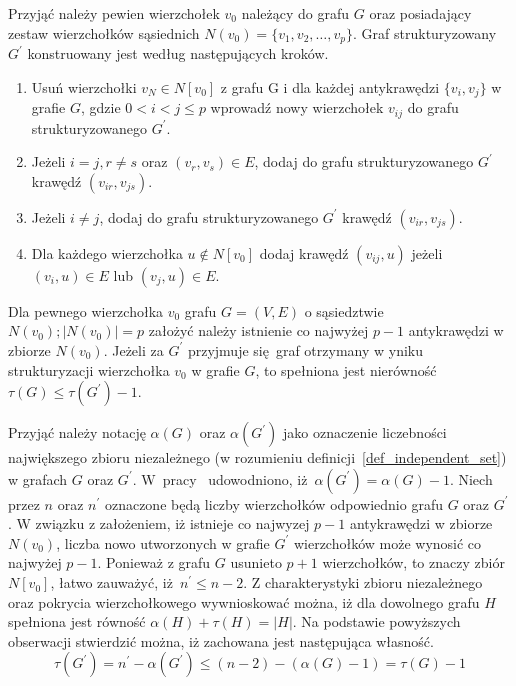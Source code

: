 {  Przyjąć należy pewien wierzchołek $v_0$ należący do grafu $G$ oraz posiadający zestaw wierzchołków sąsiednich $N(v_0)=\{v_1, v_2, \ldots, v_p\}$.
  Graf strukturyzowany $G^\prime$ konstruowany jest według następujących kroków.
  \begin{enumerate}
    \item Usuń wierzchołki $v_N \in N[v_0]$ z grafu G i dla każdej antykrawędzi $\{v_i, v_j\}$ w grafie $G$, gdzie $0 < i < j \leq p$ wprowadź nowy wierzchołek $v_{ij}$ do grafu strukturyzowanego $G^\prime$.
    \item Jeżeli $i=j, r\neq s$ oraz $(v_r, v_s) \in E$, dodaj do grafu strukturyzowanego $G^\prime$ krawędź $(v_{ir}, v_{js})$.
    \item Jeżeli $i \neq j$, dodaj do grafu strukturyzowanego $G^\prime$ krawędź $(v_{ir}, v_{js})$.
    \item Dla każdego wierzchołka $u \notin N[v_0]$ dodaj krawędź $(v_{ij}, u)$ jeżeli $(v_i, u) \in E$ lub $(v_j, u) \in E$.
  \end{enumerate}
  \begin{theorem}
    Dla pewnego wierzchołka $v_0$ grafu $G=(V, E)$ o sąsiedztwie $N(v_0); |N(v_0)|=p$ założyć należy istnienie co najwyżej $p-1$ antykrawędzi w zbiorze $N(v_0)$.
    Jeżeli za $G^\prime$ przyjmuje się graf otrzymany w yniku strukturyzacji wierzchołka $v_0$ w grafie $G$, to spełniona jest nierówność $\tau(G) \leq \tau(G^\prime) - 1$.
  \end{theorem}
  \begin{bproof}
    Przyjąć należy notację $\alpha(G)$ oraz $\alpha(G^\prime)$ jako oznaczenie liczebności największego zbioru niezależnego (w rozumieniu definicji~\ref{def_independent_set}) w grafach $G$ oraz $G^\prime$.
    W~pracy~\cite{Ebengger:1984} udowodniono, iż $\alpha(G^\prime)=\alpha(G) - 1$.
    Niech przez $n$ oraz $n^\prime$ oznaczone będą liczby wierzchołków odpowiednio grafu $G$ oraz $G^\prime$.
    W związku z założeniem, iż istnieje co najwyzej $p - 1$ antykrawędzi w zbiorze $N(v_0)$, liczba nowo utworzonych w grafie $G^\prime$ wierzchołków może wynosić co najwyżej $p - 1$.
    Ponieważ z grafu $G$ usunieto $p+1$ wierzchołków, to znaczy zbiór $N[v_0]$, łatwo zauważyć, iż $n^\prime \leq n-2$.
    Z charakterystyki zbioru niezależnego oraz pokrycia wierzchołkowego wywnioskować można, iż dla dowolnego grafu $H$ spełniona jest równość $\alpha(H)+\tau(H)=|H|$.
    Na podstawie powyższych obserwacji stwierdzić można, iż zachowana jest następująca własność.
    \[\tau(G^\prime)=n^\prime-\alpha(G^\prime)\leq (n-2)-(\alpha(G)-1)=\tau(G)-1\]
  \end{bproof}
}
